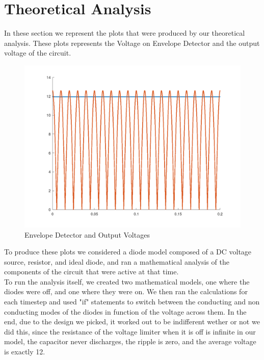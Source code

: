 \section{Theoretical Analysis}
\label{sec:analysis}


In these section we represent the plots that were produced by our theoretical analysis. These plots represents the Voltage on Envelope Detector and the output voltage of the circuit.

\begin{figure} [!htb] 
  \includegraphics[width=\linewidth]{Condensador.png}
  \caption{Envelope Detector and Output Voltages}
  \label{fig:theoplots}
  \endminipage\hfill
\end{figure}

To produce these plots we considered a diode model composed of a DC voltage source, resistor, and ideal diode, and ran a mathematical analysis of the components of the circuit that were active at that time.\\
To run the analysis itself, we created two mathematical models, one where the diodes were off, and one where they were on. We then ran the calculations for each timestep and used "if" statements to switch between the conducting and non conducting modes of the diodes in function of the voltage across them. In the end, due to the design we picked, it worked out to be indifferent wether or not we did this, since the resistance of the voltage limiter when it is off is infinite in our model, the capacitor never discharges, the ripple is zero, and the average voltage is exactly 12.


